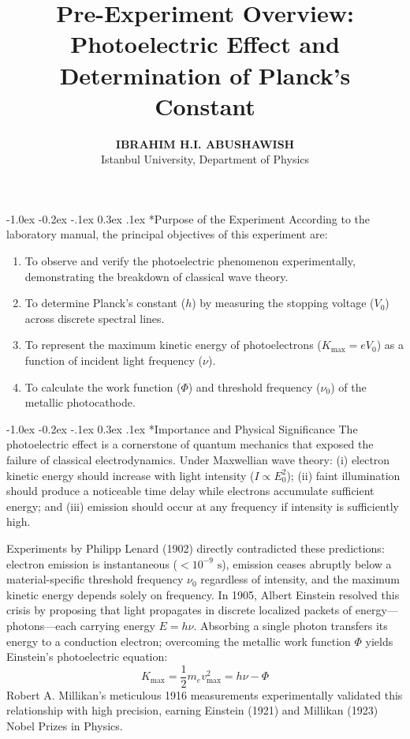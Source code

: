 \documentclass[11pt,a4paper]{article}
\title{\vspace{-2.8em}\textbf{Pre-Experiment Overview:\\ Photoelectric Effect and Determination of Planck's Constant}\vspace{-0.7em}}
\author{\textbf{IBRAHIM H.I. ABUSHAWISH} \\ Istanbul University, Department of Physics}
\date{}
\makeatletter
\renewcommand\section{\@startsection {section}{1}{\z@}%
                                   {-1.0ex \@plus -0.2ex \@minus -.1ex}%
                                   {0.3ex \@plus .1ex}%
                                   {\normalfont\large\bfseries}}
\makeatother
\begin{document}
\maketitle
\vspace{-1.4em}

\section*{Purpose of the Experiment}
According to the laboratory manual, the principal objectives of this experiment are:
\begin{enumerate}
    \setlength{\itemsep}{0pt}
    \setlength{\parskip}{0pt}
    \item To observe and verify the photoelectric phenomenon experimentally, demonstrating the breakdown of classical wave theory.
    \item To determine Planck's constant ($h$) by measuring the stopping voltage ($V_0$) across discrete spectral lines.
    \item To represent the maximum kinetic energy of photoelectrons ($K_{\max} = e V_0$) as a function of incident light frequency ($\nu$).
    \item To calculate the work function ($\Phi$) and threshold frequency ($\nu_0$) of the metallic photocathode.
\end{enumerate}

\section*{Importance and Physical Significance}
The photoelectric effect is a cornerstone of quantum mechanics that exposed the failure of classical electrodynamics. Under Maxwellian wave theory: (i) electron kinetic energy should increase with light intensity ($I \propto E_0^2$); (ii) faint illumination should produce a noticeable time delay while electrons accumulate sufficient energy; and (iii) emission should occur at any frequency if intensity is sufficiently high. 

Experiments by Philipp Lenard (1902) directly contradicted these predictions: electron emission is instantaneous ($< 10^{-9}\text{ s}$), emission ceases abruptly below a material-specific threshold frequency $\nu_0$ regardless of intensity, and the maximum kinetic energy depends solely on frequency. In 1905, Albert Einstein resolved this crisis by proposing that light propagates in discrete localized packets of energy---photons---each carrying energy $E = h\nu$. Absorbing a single photon transfers its energy to a conduction electron; overcoming the metallic work function $\Phi$ yields Einstein's photoelectric equation:
\begin{equation}
    K_{\max} = \frac{1}{2} m_e v_{\max}^2 = h\nu - \Phi
\end{equation}
Robert A. Millikan's meticulous 1916 measurements experimentally validated this relationship with high precision, earning Einstein (1921) and Millikan (1923) Nobel Prizes in Physics.
\end{document}
